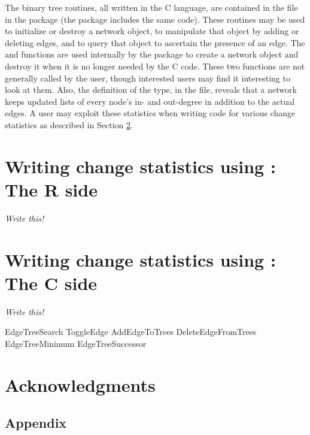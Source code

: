 \documentclass[article]{jss}
\begin{document}
The binary tree routines, all written in the C language, are contained in the 
 file in the  package (the  package
includes the same code).  These routines may be used to initialize or destroy
a network object, to manipulate that object by adding or deleting edges, and to
query that object to ascertain the presence of an edge.
The  and  functions 
are used internally by the  package to create a network object 
and destroy it when it is no longer needed by the C code.  These two functions
are not generally called by the user, though interested users may find it interesting
to look at them.  Also, the definition of the  type, in the 
 file, reveals that a network keeps updated lists of every node's
in- and out-degree in addition to the actual edges.  A user may exploit these statistics 
when writing code for various change statistics as described in Section \ref{Cside}.


\section[Writing change statistics using ergmuserterms:  The R side]%
{Writing change statistics using :  The R side}
\label{Rside}

{\em Write this!}

\section[Writing change statistics using ergmuserterms:  The C side]%
{Writing change statistics using :  The C side}
\label{Cside}

{\em Write this!}


EdgeTreeSearch
ToggleEdge
AddEdgeToTrees
DeleteEdgeFromTrees
EdgeTreeMinimum
EdgeTreeSuccessor





\section*{Acknowledgments}





\newpage

\begin{appendix}


\section[appendix]{Appendix}
\label{appendix}

\end{appendix}
\end{document}
